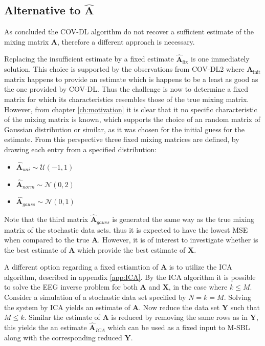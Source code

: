 \subsection{Alternative to $\hat{\textbf{A}}$}  
As concluded the COV-DL algorithm do not recover a sufficient estimate of the mixing matrix $\mathbf{A}$, therefore a different approach is necessary. 

Replacing the insufficient estimate by a fixed estimate $\hat{\mathbf{A}}_{\text{fix}}$ is one immediately solution. This choice is supported by the observations from COV-DL2 where $\textbf{A}_{\text{init}}$ matrix happens to provide an estimate which is happens to be a least as good as the one provided by COV-DL. 
Thus the challenge is now to determine a fixed matrix for which its characteristics resembles those of the true mixing matrix. However, from chapter \ref{ch:motivation} it is clear that it no specific characteristic of the mixing matrix is known, which supports the choice of an random matrix of Gaussian distribution or similar, as it was chosen for the initial guess for the estimate.   
From this perspective three fixed mixing matrices are defined, by drawing each entry from a specified distribution: 
\begin{itemize}
\item[] $\hat{\textbf{A}}_{uni}\sim \mathcal{U}(-1,1)$
\item[] $\hat{\textbf{A}}_{norm}\sim \mathcal{N}(0, 2)$ 
\item[] $\hat{\textbf{A}}_{gauss}\sim \mathcal{N}(0,1)$                                           
\end{itemize}

Note that the third matrix $\hat{\textbf{A}}_{gauss}$ is generated the same way as the true mixing matrix of the stochastic data sets. thus it is expected to have the lowest MSE when compared to the true $\textbf{A}$. However, it is of interest to investigate whether is the best estimate of $\textbf{A}$ which provide the best estimate of $\textbf{X}$.   

A different option regarding a fixed estiamtion of $\textbf{A}$ is to utilize the ICA algorithm, described in appendix \ref{app:ICA}. By the ICA algorithm it is possible to solve the EEG inverse problem for both $\textbf{A}$ and $\textbf{X}$, in the case where $k \leq M$.
Consider a simulation of a stochastic data set specified by $N = k = M$. Solving the system by ICA yields an estimate of $\textbf{A}$. Now reduce the data set $\textbf{Y}$ such that $M \leq k$. Similar the estimate of $\textbf{A}$ is reduced by removing the same rows as in $\textbf{Y}$, this yields the an estimate $\hat{\textbf{A}}_{ICA}$ which can be used as a fixed input to M-SBL along with the corresponding reduced $\textbf{Y}$.

